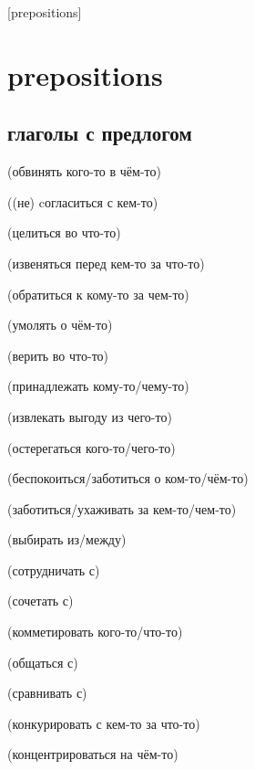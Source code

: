 [prepositions]

\section{prepositions}
\subsection {глаголы с предлогом}
\begin{description}
    \item {} (обвинять кого-то в чём-то)
    \item {} ((не) cогласиться с кем-то)
    \item {} (целиться во что-то)
    \item {} (извеняться перед кем-то за что-то)
    \item {} (обратиться к кому-то за чем-то)
    \item {} (умолять о чём-то)
    \item {} (верить во что-то)
    \item {} (принадлежать кому-то/чему-то)
    \item {} (извлекать выгоду из чего-то)
    \item {} (остерегаться кого-то/чего-то)
    \item {} (беспокоиться/заботиться о ком-то/чём-то)
    \item {} (заботиться/ухаживать за кем-то/чем-то)
    \item {} (выбирать из/между)
    \item {} (сотрудничать с)
    \item {} (сочетать с)
    \item {} (комметировать кого-то/что-то)
    \item {} (общаться с)
    \item {} (сравнивать с)
    \item {} (конкурировать с кем-то за что-то)
    \item {} (концентрироваться на чём-то)
\end{description}
